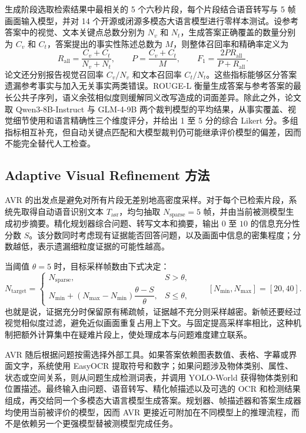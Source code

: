 生成阶段选取检索结果中最相关的 5 个六秒片段，每个片段结合语音转写与 5 帧画面输入模型，并对 14 个开源或闭源多模态大语言模型进行零样本测试。设参考答案中的视觉、文本关键点总数分别为 $N_v$ 和 $N_t$，生成答案正确覆盖的数量分别为 $C_v$ 和 $C_t$，答案提出的事实性陈述总数为 $M$，则整体召回率和精确率定义为
\begin{equation}
  R_{\mathrm{all}}=\frac{C_v+C_t}{N_v+N_t},\qquad
  P=\frac{C_v+C_t}{M},\qquad
  F_1=\frac{2PR_{\mathrm{all}}}{P+R_{\mathrm{all}}}.
  \label{eq:cfvbench-metrics}
\end{equation}
论文还分别报告视觉召回率 $C_v/N_v$ 和文本召回率 $C_t/N_t$。这些指标能够区分答案遗漏参考事实与加入无关事实两类错误。ROUGE-L 衡量生成答案与参考答案的最长公共子序列，语义余弦相似度则缓解同义改写造成的词面差异。除此之外，论文取 Qwen3-8B-Instruct 与 GLM-4-9B 两个裁判模型的平均结果，从事实覆盖、视觉细节使用和语言精确性三个维度评分，并给出 1 至 5 分的综合 Likert 分。多组指标相互补充，但自动关键点匹配和大模型裁判仍可能继承评价模型的偏差，因而不能完全替代人工检查。

\subsection{Adaptive Visual Refinement 方法}

AVR 的出发点是避免对所有片段无差别地高密度采样。对于每个已检索片段，系统先取得自动语音识别文本 $T_{\mathrm{asr}}$，均匀抽取 $N_{\mathrm{sparse}}=5$ 帧，并由当前被测模型生成初步摘要。精化规划器综合问题、转写文本和摘要，输出 $0$ 至 $10$ 的信息充分性分数 $S$。该分数同时考虑现有证据能否回答问题，以及画面中信息的密集程度；分数越低，表示遗漏细粒度证据的可能性越高。

当阈值 $\theta=5$ 时，目标采样帧数由下式决定：
\begin{equation}
  N_{\mathrm{target}}=
  \begin{cases}
    N_{\mathrm{sparse}}, & S>\theta,\\
    N_{\min}+(N_{\max}-N_{\min})\dfrac{\theta-S}{\theta}, & S\leq\theta,
  \end{cases}
  \qquad [N_{\min},N_{\max}]=[20,40].
  \label{eq:avr-sampling}
\end{equation}
也就是说，证据充分时保留原有稀疏帧，证据越不充分则采样越密。新帧还要经过视觉相似度过滤，避免近似画面重复占用上下文。与固定提高采样率相比，这种机制把额外计算集中在疑难片段上，使处理成本与问题难度建立联系。

AVR 随后根据问题按需选择外部工具。如果答案依赖图表数值、表格、字幕或界面文字，系统使用 EasyOCR 提取符号和数字；如果问题涉及物体类别、属性、状态或空间关系，则从问题生成检测词表，并调用 YOLO-World 获得物体类别和位置描述。最终输入由问题、语音转写、精化帧描述以及可选的 OCR 和检测结果组成，再交给同一个多模态大语言模型生成答案。规划器、帧描述器和答案生成器均使用当前被评价的模型，因而 AVR 更接近可附加在不同模型上的推理流程，而不是依赖另一个更强模型替被测模型完成任务。

